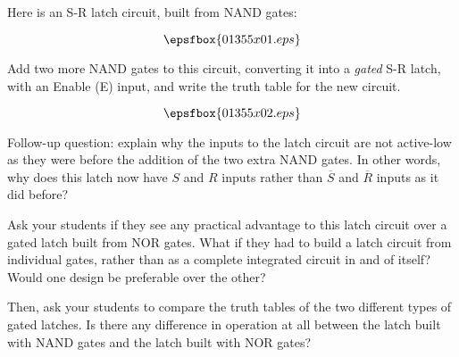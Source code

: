 

Here is an S-R latch circuit, built from NAND gates:

$$\epsfbox{01355x01.eps}$$

Add two more NAND gates to this circuit, converting it into a {\it gated} S-R latch, with an Enable (E) input, and write the truth table for the new circuit.







$$\epsfbox{01355x02.eps}$$

\vskip 10pt

Follow-up question: explain why the inputs to the latch circuit are not active-low as they were before the addition of the two extra NAND gates.  In other words, why does this latch now have $S$ and $R$ inputs rather than $\overline{S}$ and $\overline{R}$ inputs as it did before?







Ask your students if they see any practical advantage to this latch circuit over a gated latch built from NOR gates.  What if they had to build a latch circuit from individual gates, rather than as a complete integrated circuit in and of itself?  Would one design be preferable over the other?

Then, ask your students to compare the truth tables of the two different types of gated latches.  Is there any difference in operation at all between the latch built with NAND gates and the latch built with NOR gates?



